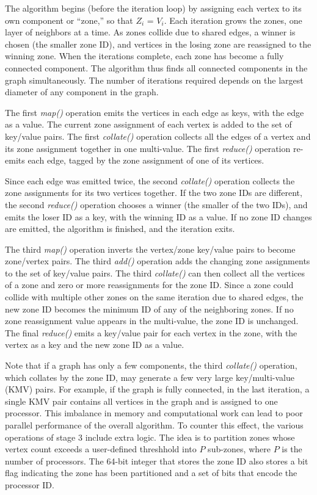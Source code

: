 The algorithm begins (before the iteration loop) by assigning each
vertex to its own component or ``zone,'' so that $Z_i$ = $V_i$.  Each
iteration grows the zones, one layer of neighbors at a time.  As
zones collide due to shared edges, a winner is chosen (the smaller
zone ID), and vertices in the losing zone are reassigned to the
winning zone.  When the iterations complete, each zone has
become a fully connected component.  The algorithm thus finds all
connected components in the graph simultaneously.  The number of
iterations required depends on the largest diameter of any component
in the graph.

The first {\it map()} operation emits the vertices in each edge as
keys, with the edge as a value.  The current zone assignment of each
vertex is added to the set of key/value pairs.  The first {\it
collate()} operation collects all the edges of a vertex and its zone
assignment together in one multi-value.  The first {\it reduce()}
operation re-emits each edge, tagged by the zone assignment of
one of its vertices.

Since each edge was emitted twice, the second {\it collate()}
operation collects the zone assignments for its two vertices together.
If the two zone IDs are different, the second {\it reduce()} operation
chooses a winner (the smaller of the two IDs), and emits the loser ID as a
key, with the winning ID as a value.  If no zone ID changes are
emitted, the algorithm is finished, and the iteration exits.

The third {\it map()} operation inverts the vertex/zone key/value
pairs to become zone/vertex pairs.  The third {\it add()} operation
adds the changing zone assignments to the set of key/value pairs.  The
third {\it collate()} can then collect all the vertices of a zone and zero
or more reassignments for the zone ID.  Since a zone could collide
with multiple other zones on the same iteration due to shared edges,
the new zone ID becomes the minimum ID of any of the neighboring
zones.  If no zone reassignment value appears in the multi-value, the
zone ID is unchanged.  The final {\it reduce()} emits a key/value pair for each
vertex in the zone, with the vertex as a key and the new zone ID as a
value.

Note that if a graph has only a few components, the third {\it
collate()} operation, which collates by the zone ID, may generate a few
very large key/multi-value (KMV) pairs.  For example, if the graph is
fully connected, in the last iteration, a single KMV pair 
contains all vertices in the graph and is assigned to one processor.
This imbalance in memory and computational work can lead to poor
parallel performance of the overall algorithm.  To counter this
effect, the various operations of stage 3 include extra logic.  The
idea is to partition zones whose vertex count exceeds a user-defined
threshhold into $P$ sub-zones, where $P$ is the number of processors.
The 64-bit integer that stores the zone ID also stores a bit flag
indicating the zone has been partitioned and a set of bits that encode
the processor ID.

